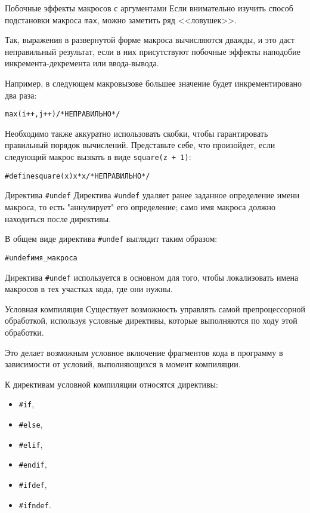 \documentclass{beamer}
\begin{document}
\begin{frame}{Побочные эффекты макросов с аргументами}
    Если внимательно изучить способ подстановки макроса \texttt{max}, можно заметить ряд <<ловушек>>.
    
    \medskip
    Так, выражения в развернутой форме макроса вычисляются дважды, и это даст неправильный результат, если в них присутствуют побочные эффекты наподобие инкремента-декремента или ввода-вывода. 
    
    \medskip
    Например, в следующем макровызове большее значение будет инкрементировано два раза:
    
    \medskip
    \begin{alltt}
    max(i++, j++) /* НЕПРАВИЛЬНО */
    \end{alltt}
    
    Необходимо также аккуратно использовать скобки, чтобы гарантировать правильный порядок вычислений. Представьте себе, что произойдет, если следующий макрос вызвать в виде \texttt{square(z + 1)}:
    
    \begin{alltt}
    \#define square(x) x * x /* НЕПРАВИЛЬНО */
    \end{alltt}
\end{frame}

\begin{frame}{Директива \texttt{\#undef}}
    Директива \texttt{\#undef} удаляет ранее заданное определение имени макроса, то есть "аннулирует" его определение; само имя макроса должно находиться после директивы.
    
    \medskip
    В общем виде директива \texttt{\#undef} выглядит таким образом:
    
    \begin{alltt}
    \#undef имя\_макроса
    \end{alltt}
    
    Директива \texttt{\#undef} используется в основном для того, чтобы локализовать имена макросов в тех участках кода, где они нужны.
\end{frame}

\begin{frame}{Условная компиляция}
    Существует возможность управлять самой препроцессорной обработкой, используя условные директивы, которые выполняются по ходу этой обработки.
    
    \medskip
    Это делает возможным условное включение фрагментов кода в программу в зависимости от условий, выполняющихся в момент компиляции.
    
    \medskip
    К директивам условной компиляции относятся директивы:
    \begin{itemize}
        \item \texttt{\#if},
        \item \texttt{\#else},
        \item \texttt{\#elif},
        \item \texttt{\#endif},
        \item \texttt{\#ifdef},
        \item \texttt{\#ifndef}.
    \end{itemize}
\end{frame}
\end{document}
